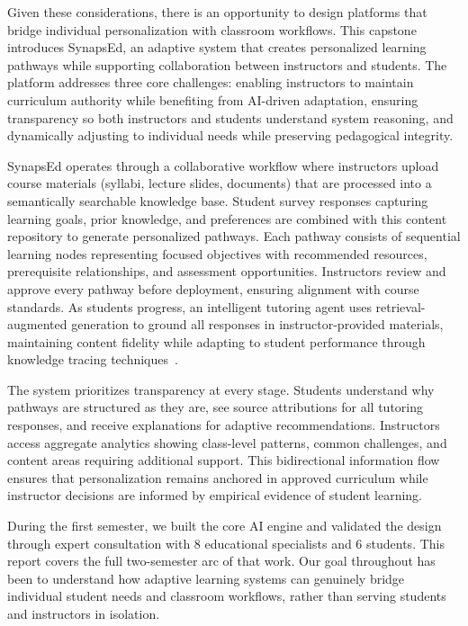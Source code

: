 \documentclass{stylefiles/capstone}
\begin{document}
Given these considerations, there is an opportunity to design platforms that bridge individual personalization with classroom workflows. This capstone introduces SynapsEd, an adaptive system that creates personalized learning pathways while supporting collaboration between instructors and students. The platform addresses three core challenges: enabling instructors to maintain curriculum authority while benefiting from AI-driven adaptation, ensuring transparency so both instructors and students understand system reasoning, and dynamically adjusting to individual needs while preserving pedagogical integrity.

SynapsEd operates through a collaborative workflow where instructors upload course materials (syllabi, lecture slides, documents) that are processed into a semantically searchable knowledge base. Student survey responses capturing learning goals, prior knowledge, and preferences are combined with this content repository to generate personalized pathways. Each pathway consists of sequential learning nodes representing focused objectives with recommended resources, prerequisite relationships, and assessment opportunities. Instructors review and approve every pathway before deployment, ensuring alignment with course standards. As students progress, an intelligent tutoring agent uses retrieval-augmented generation to ground all responses in instructor-provided materials, maintaining content fidelity while adapting to student performance through knowledge tracing techniques~\cite{10933562}.

The system prioritizes transparency at every stage. Students understand why pathways are structured as they are, see source attributions for all tutoring responses, and receive explanations for adaptive recommendations. Instructors access aggregate analytics showing class-level patterns, common challenges, and content areas requiring additional support. This bidirectional information flow ensures that personalization remains anchored in approved curriculum while instructor decisions are informed by empirical evidence of student learning.

During the first semester, we built the core AI engine and validated the design through expert consultation with 8 educational specialists and 6 students. This report covers the full two-semester arc of that work. Our goal throughout has been to understand how adaptive learning systems can genuinely bridge individual student needs and classroom workflows, rather than serving students and instructors in isolation.
\end{document}
